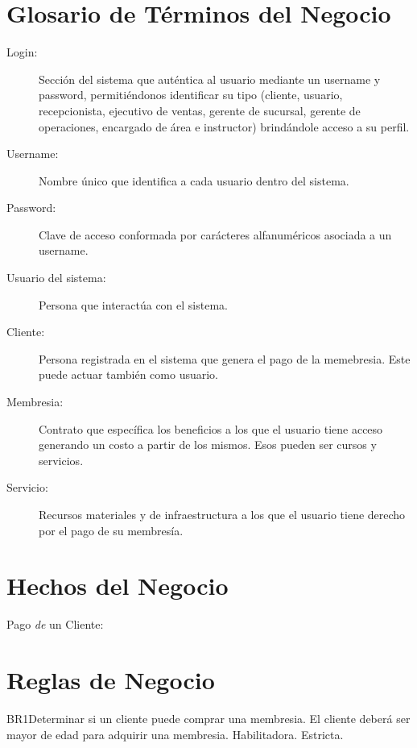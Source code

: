 \section{Glosario de Términos del Negocio}

\begin{description}
	\item[Login:] Sección del sistema que auténtica al usuario mediante un username y password, permitiéndonos identificar su tipo (cliente, usuario, recepcionista, ejecutivo de ventas, gerente de sucursal, gerente de operaciones, encargado de área e instructor) brindándole acceso a su perfil.
	\item[Username:] Nombre único que identifica a cada usuario dentro del sistema.
	\item[Password:] Clave de acceso conformada por carácteres alfanuméricos asociada a un username.
	\item[Usuario del sistema:] Persona que interactúa con el sistema.  
	\item[Cliente:] Persona registrada en el sistema que genera el pago de la memebresia. Este puede actuar también como usuario.
	\item[Membresia:] Contrato que específica los beneficios a los que el usuario tiene acceso generando un costo a partir de los mismos. Esos pueden ser cursos y servicios.
	\item[Servicio:] Recursos materiales y de infraestructura a los que el usuario tiene derecho por el pago de su membresía.
\end{description}

\section{Hechos del Negocio}

\begin{description}
	\item[Pago {\em de} un Cliente:]
\end{description}

\section{Reglas de Negocio}

\begin{BussinesRule}{BR1}{Determinar si un cliente puede comprar una membresia.} 
	\BRitem[Descripción:] El cliente deberá ser mayor de edad para adquirir una membresia.
	\BRitem[Tipo:] Habilitadora.
	\BRitem[Nivel:] Estricta.
\end{BussinesRule}

